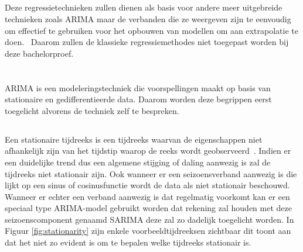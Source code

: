 \subsection{}

Deze regressietechnieken zullen dienen als basis voor andere meer uitgebreide technieken zoals ARIMA maar de verbanden die ze weergeven zijn te eenvoudig om effectief te gebruiken voor het opbouwen van modellen om aan extrapolatie te doen.~\autocite{Sinha2019} Daarom zullen de klassieke regressiemethodes niet toegepast worden bij deze bachelorproef. 

\clearpage
\section{}
\label{sec: Theoretische toelichting over ARIMA}

ARIMA is een modeleringstechniek die voorspellingen maakt op basis van stationaire en gedifferentieerde data. Daarom worden deze begrippen eerst toegelicht alvorens de techniek zelf te bespreken. 

\subsection{}

Een stationaire tijdreeks is een tijdreeks waarvan de eigenschappen niet afhankelijk zijn van het tijdstip waarop de reeks wordt geobserveerd~\autocite{Hyndman2018}. Indien er een duidelijke trend dus een algemene stijging of daling aanwezig is zal de tijdreeks niet stationair zijn. Ook wanneer er een seizoensverband aanwezig is die lijkt op een sinus of cosinusfunctie wordt de data als niet stationair beschouwd. Wanneer er echter een verband aanwezig is dat regelmatig voorkomt kan er een speciaal type ARIMA-model gebruikt worden dat rekening zal houden met deze seizoenscomponent genaamd SARIMA deze zal zo dadelijk toegelicht worden.
In Figuur \ref{fig:stationarity} zijn enkele voorbeeldtijdreeksen zichtbaar dit toont aan dat het niet zo evident is om te bepalen welke tijdreeks stationair is.

